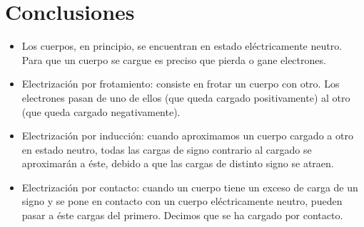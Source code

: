 \section{Conclusiones}
\begin{itemize}[label=\textbf{$\bullet$},itemsep=2pt,partopsep=6pt]
	\item Los cuerpos, en principio, se encuentran en estado eléctricamente neutro. Para
	      que un cuerpo se cargue es preciso que pierda o gane electrones.
	\item Electrización por frotamiento: consiste en frotar un cuerpo con otro. Los
	      electrones pasan de uno de ellos (que queda cargado positivamente) al otro (que
	      queda cargado negativamente).
	\item Electrización por inducción: cuando aproximamos un cuerpo cargado a otro en
	      estado neutro, todas las cargas de signo contrario al cargado se aproximarán a
	      éste, debido a que las cargas de distinto signo se atraen.
	\item Electrización por contacto: cuando un cuerpo tiene un exceso de carga de un
	      signo y se pone en contacto con un cuerpo eléctricamente neutro, pueden pasar a
	      éste cargas del primero. Decimos que se ha cargado por contacto.
\end{itemize}
